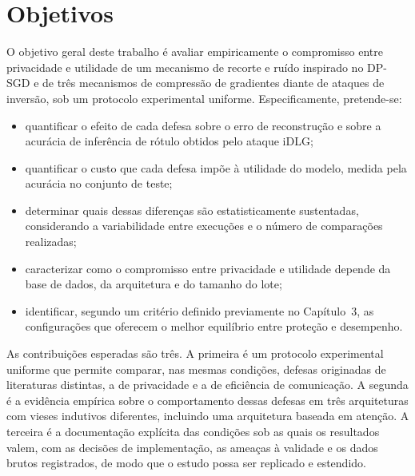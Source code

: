 \section{Objetivos}

O objetivo geral deste trabalho é avaliar empiricamente o compromisso entre privacidade e utilidade de um mecanismo de recorte e ruído inspirado no DP-SGD e de três mecanismos de compressão de gradientes diante de ataques de inversão, sob um protocolo experimental uniforme. Especificamente, pretende-se:

\begin{itemize}
  \item quantificar o efeito de cada defesa sobre o erro de reconstrução e sobre a acurácia de inferência de rótulo obtidos pelo ataque iDLG;
  \item quantificar o custo que cada defesa impõe à utilidade do modelo, medida pela acurácia no conjunto de teste;
  \item determinar quais dessas diferenças são estatisticamente sustentadas, considerando a variabilidade entre execuções e o número de comparações realizadas;
  \item caracterizar como o compromisso entre privacidade e utilidade depende da base de dados, da arquitetura e do tamanho do lote;
  \item identificar, segundo um critério definido previamente no Capítulo~3, as configurações que oferecem o melhor equilíbrio entre proteção e desempenho.
\end{itemize}

As contribuições esperadas são três. A primeira é um protocolo experimental uniforme que permite comparar, nas mesmas condições, defesas originadas de literaturas distintas, a de privacidade e a de eficiência de comunicação. A segunda é a evidência empírica sobre o comportamento dessas defesas em três arquiteturas com vieses indutivos diferentes, incluindo uma arquitetura baseada em atenção. A terceira é a documentação explícita das condições sob as quais os resultados valem, com as decisões de implementação, as ameaças à validade e os dados brutos registrados, de modo que o estudo possa ser replicado e estendido.

